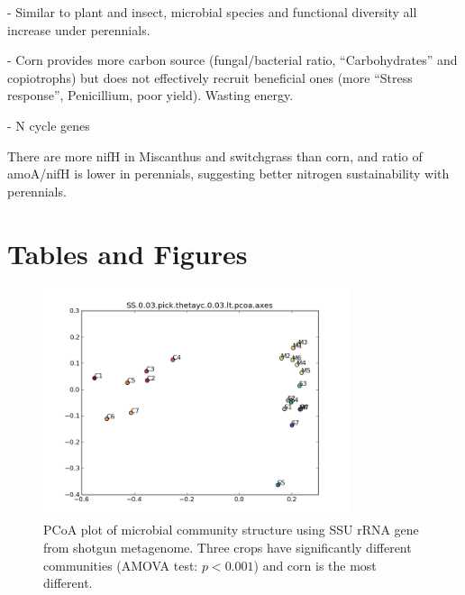 \documentclass[12pt]{article}
\begin{document}
- Similar to plant and insect, microbial species and functional diversity all increase under perennials.

- Corn provides more carbon source (fungal/bacterial ratio, ``Carbohydrates'' and copiotrophs) but does not effectively recruit beneficial ones (more ``Stress response'', Penicillium, poor yield). Wasting energy.

- N cycle genes

There are more nifH in Miscanthus and switchgrass than corn, and ratio of amoA/nifH is lower in perennials, suggesting better nitrogen sustainability with perennials.

\section{Tables and Figures}

    \begin{figure}[tbph!]
    \centering
    \includegraphics[width=0.8\textwidth]{figures/otu-pcoa.png}
    \caption[PCoA plot of microbial community structure using SSU rRNA gene]{PCoA plot of microbial community structure using SSU rRNA gene from shotgun metagenome. Three crops have significantly different communities (AMOVA test: $p < 0.001$) and corn is the most different.}
    \label{fig:otu-pcoa}
    \end{figure}
\end{document}
